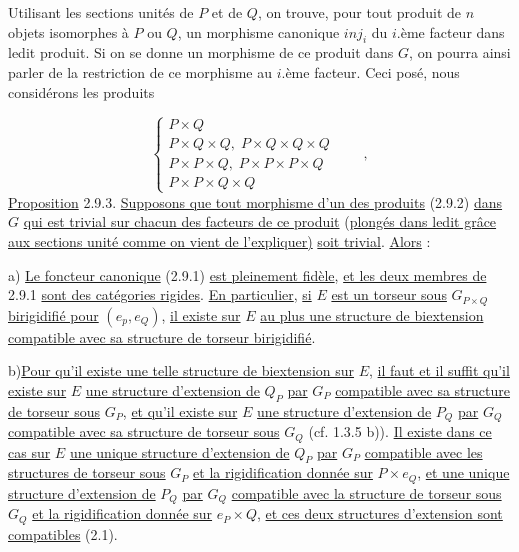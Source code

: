 Utilisant les sections unités de $P$ et de $Q$, on trouve, pour tout produit de $n$ objets isomorphes à $P$ ou $Q$, un morphisme canonique $inj_i$ du $i$.ème facteur dans ledit produit. Si on se donne un morphisme de ce produit dans $G$, on pourra ainsi parler de la restriction de ce morphisme au $i$.ème facteur. Ceci posé, nous considérons les produits

\begin{equation}\tag{2.9.2}
\left\{ \begin{array}{l} P\times Q \\[2mm] P\times Q\times Q, \; P\times Q\times Q\times Q \\[2mm] P\times P\times Q, \; P\times P\times P\times Q \\[2mm] P\times P\times Q\times Q \end{array} \right. \qquad ,
\end{equation}
\underline{Proposition} 2.9.3. \underline{Supposons que tout morphisme d'un des produits} (2.9.2) \underline{dans} $G$ \underline{qui est trivial sur chacun des facteurs de ce produit} (\underline{plongés dans ledit grâce aux sections unité comme on vient de l'expliquer)} \underline{soit trivial}. \underline{Alors} :

a)  \underline{Le foncteur canonique} (2.9.1) \underline{est pleinement fidèle}, \underline{et les deux membres de} 2.9.1 \underline{sont des catégories rigides}. \underline{En particulier}, \underline{si} $E$ \underline{est un torseur sous} $G_{P\times Q}$ \underline{birigidifié pour} $(e_p,e_Q)$, \underline{il existe sur} $E$ \underline{au plus une structure de biextension compatible avec sa structure de torseur birigidifié}.



b)\quad \underline{Pour qu'il existe une telle structure de biextension sur} $E$, \underline{il faut et il suffit qu'il existe sur} $E$ \underline{une structure d'extension de} $Q_P$ \underline{par} $G_P$ \underline{compatible avec sa structure de torseur sous} $G_P$, \underline{et qu'il existe sur} $E$ \underline{une structure d'extension de} $P_Q$ \underline{par} $G_Q$ \underline{compatible avec sa structure de torseur sous} $G_Q$ (cf. 1.3.5 b)). \underline{Il existe dans ce cas sur} $E$ \underline{une unique structure d'extension de} $Q_P$ \underline{par} $G_P$ \underline{compatible avec les structures de torseur sous} $G_P$ \underline{et la rigidification donnée sur} $P\times e_Q$, \underline{et une unique structure d'extension de} $P_Q$ \underline{par} $G_Q$ \underline{compatible avec la structure de torseur sous} $G_Q$ \underline{et la rigidification  donnée sur} $e_P\times Q$, \underline{et ces deux structures d'extension sont compatibles} (2.1).

